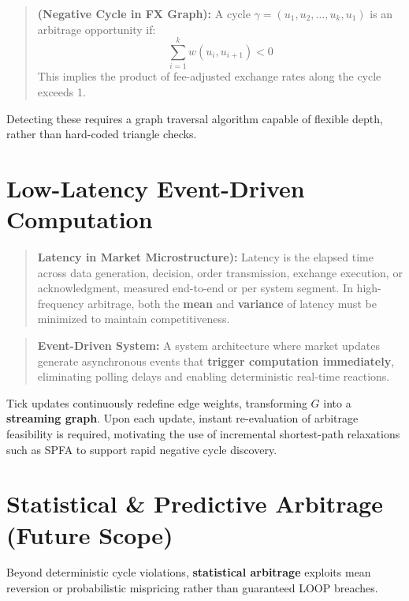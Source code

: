 \documentclass[letterpaper,11pt]{report}
\begin{document}
\begin{quote}
    \textbf{(Negative Cycle in FX Graph):}  
    A cycle $\gamma = (u_1, u_2, \dots, u_k, u_1)$ is an arbitrage opportunity if:  
    \[
    \sum_{i=1}^{k} w(u_i, u_{i+1}) < 0
    \]  
    This implies the product of fee-adjusted exchange rates along the cycle exceeds 1.
\end{quote}
 Detecting these requires a graph traversal algorithm capable of flexible depth, rather than hard-coded triangle checks.


\section{Low-Latency Event-Driven Computation}

\begin{quote}
    \textbf{Latency in Market Microstructure):}  
     Latency is the elapsed time across data generation, decision, order transmission, exchange execution, or acknowledgment, measured end-to-end or per system segment. 
    In high-frequency arbitrage, both the \textbf{mean} and \textbf{variance} of latency must be minimized to maintain competitiveness.
\end{quote}

\begin{quote}
    \textbf{Event-Driven System:}  
    A system architecture where market updates generate asynchronous events that \textbf{trigger computation immediately}, 
    eliminating polling delays and enabling deterministic real-time reactions.
\end{quote}

Tick updates continuously redefine edge weights, transforming $G$ into a \textbf{streaming graph}. 
Upon each update, instant re-evaluation of arbitrage feasibility is required, motivating the use of incremental shortest-path relaxations such as SPFA to support rapid negative cycle discovery.


\section{Statistical \& Predictive Arbitrage (Future Scope)}

Beyond deterministic cycle violations, \textbf{statistical arbitrage} exploits mean reversion or probabilistic mispricing rather than guaranteed LOOP breaches.
\end{document}
